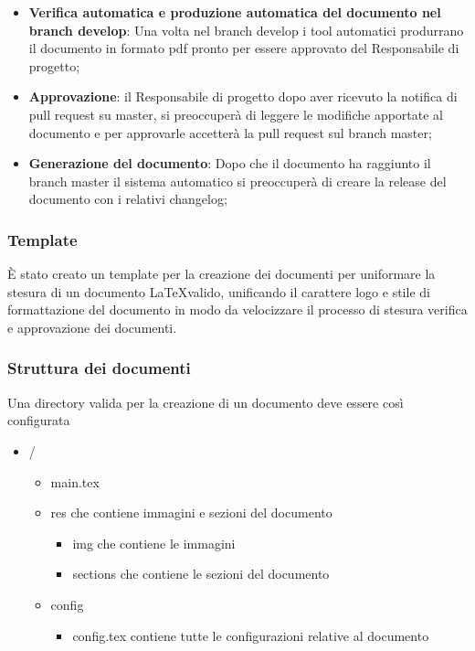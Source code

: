 \begin{itemize}
  \item \textbf{Verifica automatica e produzione automatica del documento nel
  branch develop}: Una volta nel branch develop i tool automatici produrrano il
  documento in formato pdf pronto per essere approvato del Responsabile di progetto;

  \item \textbf{Approvazione}: il Responsabile di progetto dopo aver ricevuto la notifica
  di pull request su master, si preoccuper\`a di leggere le modifiche apportate al documento
  e per approvarle accetter\`a la pull request sul branch master;

  \item \textbf{Generazione del documento}: Dopo che il documento ha raggiunto il
  branch master il sistema automatico si preoccuper\`a di creare la release del
  documento con i relativi changelog;
\end{itemize}

\subsubsection{Template}
\`E stato creato un template per la creazione dei documenti per uniformare la
stesura di un documento \LaTeX \space valido, unificando il carattere logo e
stile di formattazione del documento in modo da velocizzare il processo di
stesura verifica e approvazione dei documenti.

\subsubsection{Struttura dei documenti}
Una directory valida per la creazione di un documento deve essere così configurata
\begin{itemize}
  \item /
  \begin{itemize}
    \item main.tex
    \item res che contiene immagini e sezioni del documento
    \begin{itemize}
      \item img che contiene le immagini
      \item sections che contiene le sezioni del documento
    \end{itemize}
    \item config
    \begin{itemize}
      \item config.tex contiene tutte le configurazioni relative al documento
    \end{itemize}
  \end{itemize}
\end{itemize}
